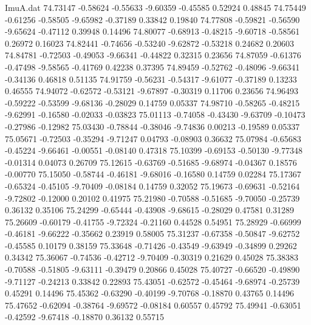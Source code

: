 \begin{filecontents}{ImuA.dat}
  74.73147   -0.58624   -0.55633   -9.60359   -0.45585    0.52924    0.48845
  74.75449   -0.61256   -0.58505   -9.65982   -0.37189    0.33842    0.19840
  74.77808   -0.59821   -0.56590   -9.65624   -0.47112    0.39948    0.14496
  74.80077   -0.68913   -0.48215   -9.60718   -0.58561    0.26972    0.16023
  74.82441   -0.74656   -0.53240   -9.62872   -0.53218    0.24682    0.20603
  74.84781   -0.72503   -0.49053   -9.66341   -0.44822    0.32315    0.23656
  74.87059   -0.61376   -0.47498   -9.58565   -0.41769    0.42238    0.37395
  74.89459   -0.52762   -0.48096   -9.66341   -0.34136    0.46818    0.51135
  74.91759   -0.56231   -0.54317   -9.61077   -0.37189    0.13233    0.46555
  74.94072   -0.62572   -0.53121   -9.67897   -0.30319    0.11706    0.23656
  74.96493   -0.59222   -0.53599   -9.68136   -0.28029    0.14759    0.05337
  74.98710   -0.58265   -0.48215   -9.62991   -0.16580   -0.02033   -0.03823
  75.01113   -0.74058   -0.43430   -9.63709   -0.10473   -0.27986   -0.12982
  75.03430   -0.78844   -0.38046   -9.74836    0.00213   -0.19589    0.05337
  75.05671   -0.72503   -0.35294   -9.71247    0.04793   -0.08903    0.36632
  75.07984   -0.65683   -0.45224   -9.66461   -0.00551   -0.08140    0.47318
  75.10399   -0.69153   -0.50130   -9.77348   -0.01314    0.04073    0.26709
  75.12615   -0.63769   -0.51685   -9.68974   -0.04367    0.18576   -0.00770
  75.15050   -0.58744   -0.46181   -9.68016   -0.16580    0.14759    0.02284
  75.17367   -0.65324   -0.45105   -9.70409   -0.08184    0.14759    0.32052
  75.19673   -0.69631   -0.52164   -9.72802   -0.12000    0.20102    0.41975
  75.21980   -0.70588   -0.51685   -9.70050   -0.25739    0.36132    0.35106
  75.24299   -0.65444   -0.43908   -9.68615   -0.28029    0.47581    0.31289
  75.26609   -0.60179   -0.41755   -9.72324   -0.21160    0.44528    0.54951
  75.28929   -0.66999   -0.46181   -9.66222   -0.35662    0.23919    0.58005
  75.31237   -0.67358   -0.50847   -9.62752   -0.45585    0.10179    0.38159
  75.33648   -0.71426   -0.43549   -9.63949   -0.34899    0.29262    0.34342
  75.36067   -0.74536   -0.42712   -9.70409   -0.30319    0.21629    0.45028
  75.38383   -0.70588   -0.51805   -9.63111   -0.39479    0.20866    0.45028
  75.40727   -0.66520   -0.49890   -9.71127   -0.24213    0.33842    0.22893
  75.43051   -0.62572   -0.45464   -9.68974   -0.25739    0.45291    0.14496
  75.45362   -0.63290   -0.40199   -9.70768   -0.18870    0.43765    0.14496
  75.47652   -0.62094   -0.38764   -9.69572   -0.08184    0.60557    0.45792
  75.49941   -0.63051   -0.42592   -9.67418   -0.18870    0.36132    0.55715

\end{filecontents}
